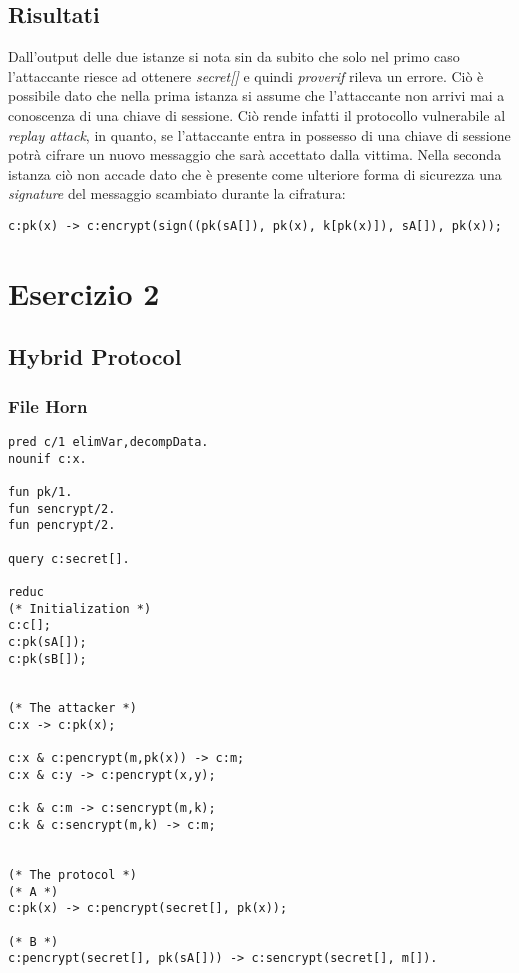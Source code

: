 \documentclass[11pt]{article}
\begin{document}
\subsection{Risultati}
\label{sec:orgb5dae2d}
Dall'output delle due istanze si nota sin da subito che solo nel primo caso l'attaccante riesce ad ottenere \emph{secret[]} e quindi \emph{proverif} rileva un errore.
Ciò è possibile dato che nella prima istanza si assume che l'attaccante non arrivi mai a conoscenza di una chiave di sessione. Ciò rende infatti il protocollo vulnerabile al \emph{replay attack}, in quanto, se l'attaccante entra in possesso di una chiave di sessione potrà cifrare un nuovo messaggio che sarà accettato dalla vittima.
Nella seconda istanza ciò non accade dato che è presente come ulteriore forma di sicurezza una \emph{signature} del messaggio scambiato durante la cifratura:

\begin{center}
\begin{verbatim}
c:pk(x) -> c:encrypt(sign((pk(sA[]), pk(x), k[pk(x)]), sA[]), pk(x));
\end{verbatim}
\end{center}

\section{Esercizio 2}
\label{sec:orgd8a2367}
\subsection{Hybrid Protocol}
\label{sec:org2a9580d}
\subsubsection{File Horn}
\label{sec:orga428347}
\begin{verbatim}
pred c/1 elimVar,decompData.
nounif c:x.

fun pk/1.
fun sencrypt/2.
fun pencrypt/2.

query c:secret[].

reduc
(* Initialization *)
c:c[];
c:pk(sA[]);
c:pk(sB[]);


(* The attacker *)
c:x -> c:pk(x);

c:x & c:pencrypt(m,pk(x)) -> c:m;
c:x & c:y -> c:pencrypt(x,y);

c:k & c:m -> c:sencrypt(m,k);
c:k & c:sencrypt(m,k) -> c:m;


(* The protocol *)
(* A *)
c:pk(x) -> c:pencrypt(secret[], pk(x));

(* B *)
c:pencrypt(secret[], pk(sA[])) -> c:sencrypt(secret[], m[]).
\end{verbatim}
\end{document}
